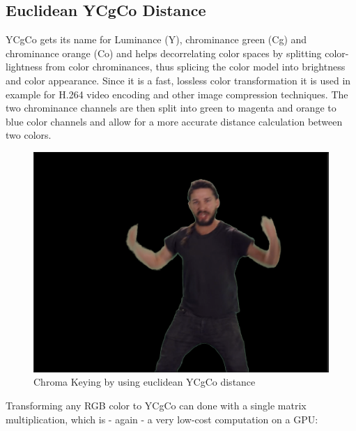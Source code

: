 \subsection{Euclidean YCgCo Distance}

YCgCo gets its name for Luminance (Y), chrominance green (Cg) and chrominance 
orange (Co) and helps decorrelating color spaces by splitting color-lightness 
from color chrominances, thus splicing the color model into brightness and 
color appearance. Since it is a fast, lossless color transformation it 
is used in example for H.264 video encoding and other image compression 
techniques. The two chrominance channels are then split into green to magenta 
and orange to blue color channels and allow for a more accurate distance 
calculation between two colors.

\begin{figure}[htb]
	\includegraphics[width=\textwidth]{_raw_resources/Comparison_YCgCo_color.png}
	\caption{Chroma Keying by using euclidean YCgCo distance}
	\label{fig:chroma:euclidean:ycgco}
\end{figure}

Transforming any RGB color to YCgCo can done with a single matrix  
multiplication, which is - again - a very low-cost computation on a GPU:


